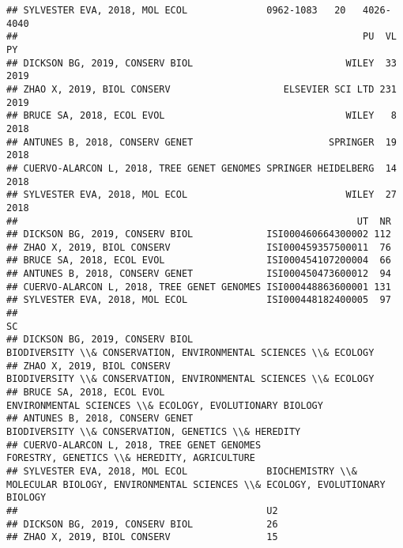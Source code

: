 \documentclass[]{article}
\begin{document}
\begin{verbatim}
## SYLVESTER EVA, 2018, MOL ECOL              0962-1083   20   4026-4040
##                                                             PU  VL   PY
## DICKSON BG, 2019, CONSERV BIOL                           WILEY  33 2019
## ZHAO X, 2019, BIOL CONSERV                    ELSEVIER SCI LTD 231 2019
## BRUCE SA, 2018, ECOL EVOL                                WILEY   8 2018
## ANTUNES B, 2018, CONSERV GENET                        SPRINGER  19 2018
## CUERVO-ALARCON L, 2018, TREE GENET GENOMES SPRINGER HEIDELBERG  14 2018
## SYLVESTER EVA, 2018, MOL ECOL                            WILEY  27 2018
##                                                            UT  NR
## DICKSON BG, 2019, CONSERV BIOL             ISI000460664300002 112
## ZHAO X, 2019, BIOL CONSERV                 ISI000459357500011  76
## BRUCE SA, 2018, ECOL EVOL                  ISI000454107200004  66
## ANTUNES B, 2018, CONSERV GENET             ISI000450473600012  94
## CUERVO-ALARCON L, 2018, TREE GENET GENOMES ISI000448863600001 131
## SYLVESTER EVA, 2018, MOL ECOL              ISI000448182400005  97
##                                                                                                                                      SC
## DICKSON BG, 2019, CONSERV BIOL                                        BIODIVERSITY \\& CONSERVATION, ENVIRONMENTAL SCIENCES \\& ECOLOGY
## ZHAO X, 2019, BIOL CONSERV                                            BIODIVERSITY \\& CONSERVATION, ENVIRONMENTAL SCIENCES \\& ECOLOGY
## BRUCE SA, 2018, ECOL EVOL                                                      ENVIRONMENTAL SCIENCES \\& ECOLOGY, EVOLUTIONARY BIOLOGY
## ANTUNES B, 2018, CONSERV GENET                                                     BIODIVERSITY \\& CONSERVATION, GENETICS \\& HEREDITY
## CUERVO-ALARCON L, 2018, TREE GENET GENOMES                                                 FORESTRY, GENETICS \\& HEREDITY, AGRICULTURE
## SYLVESTER EVA, 2018, MOL ECOL              BIOCHEMISTRY \\& MOLECULAR BIOLOGY, ENVIRONMENTAL SCIENCES \\& ECOLOGY, EVOLUTIONARY BIOLOGY
##                                            U2
## DICKSON BG, 2019, CONSERV BIOL             26
## ZHAO X, 2019, BIOL CONSERV                 15

\end{verbatim}
\end{document}
